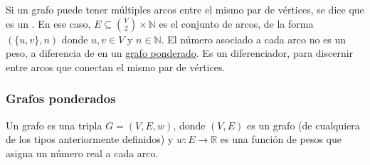 Si un grafo puede tener múltiples arcos entre el mismo par de vértices, se dice que es un . En ese caso, $E \subseteq \binom{V}{2} \times \mathbb{N}$ es el conjunto de arcos, de la forma $(\{u, v\}, n)$ donde $u,v\in V$ y $n \in \mathbb{N}$. El número asociado a cada arco no es un peso, a diferencia de en un \hyperref[sec:grafos_ponderados]{grafo ponderado}. Es un diferenciador, para discernir entre arcos que conectan el mismo par de vértices.

\subsubsection{Grafos ponderados}
\label{sec:grafos_ponderados}

Un grafo  es una tripla $G = (V, E, w)$, donde $(V, E)$ es un grafo (de cualquiera de los tipos anteriormente definidos) y $w\colon E \to \mathbb{R}$ es una función de pesos que asigna un número real a cada arco.
